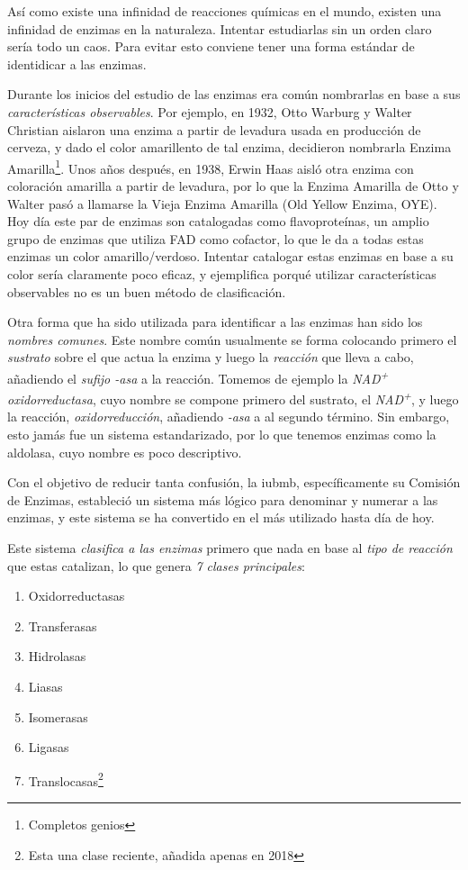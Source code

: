 
Así como existe una infinidad de reacciones químicas en el mundo, existen una infinidad de enzimas en la naturaleza. Intentar estudiarlas sin un orden claro sería todo un caos. Para evitar esto conviene tener una forma estándar de identidicar a las enzimas. 

Durante los inicios del estudio de las enzimas era común nombrarlas en base a sus \emph{características observables}. Por ejemplo, en 1932, Otto Warburg y Walter Christian aislaron una enzima a partir de levadura usada en producción de cerveza, y dado el color amarillento de tal enzima, decidieron nombrarla Enzima Amarilla\footnote{Completos genios}. Unos años después, en 1938, Erwin Haas aisló otra enzima con coloración amarilla a partir de levadura, por lo que la Enzima Amarilla de Otto y Walter pasó a llamarse la Vieja Enzima Amarilla (Old Yellow Enzima, OYE)\citep{williamsNewUsesOld2002}. Hoy día este par de enzimas son catalogadas como flavoproteínas, un amplio grupo de enzimas que utiliza FAD como cofactor, lo que le da a todas estas enzimas un color amarillo/verdoso. Intentar catalogar estas enzimas en base a su color sería claramente poco eficaz, y ejemplifica porqué utilizar características observables no es un buen método de clasificación.

Otra forma que ha sido utilizada para identificar a las enzimas han sido los \emph{nombres comunes}. Este nombre común usualmente se forma colocando primero el \emph{sustrato} sobre el que actua la enzima y luego la \emph{reacción} que lleva a cabo, añadiendo el \emph{sufijo -asa} a la reacción. Tomemos de ejemplo la \emph{NAD\textsuperscript{+} oxidorreductasa}, cuyo nombre se compone primero del sustrato, el \emph{NAD\textsuperscript{+}}, y luego la reacción, \emph{oxidorreducción}, añadiendo \emph{-asa} a al segundo término. Sin embargo, esto jamás fue un sistema estandarizado, por lo que tenemos enzimas como la aldolasa, cuyo nombre es poco descriptivo.

Con el objetivo de reducir tanta confusión, la \acrfull{iubmb}, específicamente su Comisión de Enzimas, estableció un sistema más lógico para denominar y numerar a las enzimas, y este sistema se ha convertido en el más utilizado hasta día de hoy.

Este sistema \emph{clasifica a las enzimas} primero que nada en base al \emph{tipo de reacción} que estas catalizan, lo que genera \emph{7 clases principales}:

\begin{enumerate}
    \item Oxidorreductasas
    \item Transferasas
    \item Hidrolasas
    \item Liasas
    \item Isomerasas
    \item Ligasas
    \item Translocasas\footnote{Esta una clase reciente, añadida apenas en 2018}
\end{enumerate}

